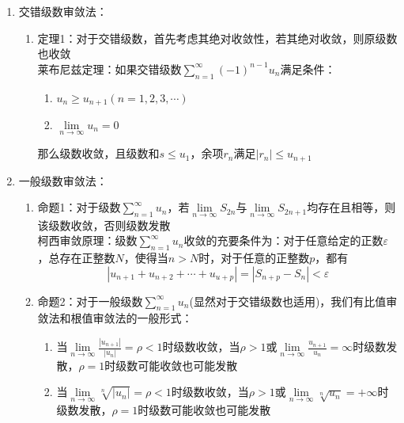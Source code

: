 \documentclass[12pt,a4paper,UTF8]{book}
\begin{document}
\begin{enumerate}
\begin{enumerate}
\end{enumerate}
\item 交错级数审敛法：
\begin{enumerate}
\item 定理1：对于交错级数，首先考虑其绝对收敛性，若其绝对收敛，则原级数也收敛\\
莱布尼兹定理：如果交错级数$\sum\limits_{n=1}^{\infty}\left(-1\right)^{n-1}u_n$满足条件：
\begin{enumerate}
\item $u_n\ge u_{n+1}\left(n=1,2,3,\cdots\right)$
\item $\lim\limits_{n\to\infty}u_n=0$
\end{enumerate}
那么级数收敛，且级数和$s\leq u_1$，余项$r_n$满足$\left|r_n\right|\leq u_{n+1}$
\end{enumerate}
\item 一般级数审敛法：
\begin{enumerate}
\item 命题1：对于级数$\sum\limits_{n=1}^{\infty}u_n$，若$\lim\limits_{n\to\infty}S_{2n}$与$\lim\limits_{n\to\infty}S_{2n+1}$均存在且相等，则该级数收敛，否则级数发散\\
柯西审敛原理：级数$\sum\limits_{n=1}^{\infty}u_n$收敛的充要条件为：对于任意给定的正数$\varepsilon$，总存在正整数$N$，使得当$n>N$时，对于任意的正整数$p$，都有
\[\left|u_{n+1}+u_{n+2}+\cdots+u_{u+p}\right|=\left|S_{n+p}-S_{n}\right|<\varepsilon\]
\item 命题2：对于一般级数$\sum\limits_{n=1}^{\infty}u_n$(显然对于交错级数也适用)，我们有比值审敛法和根值审敛法的一般形式：
\begin{enumerate}
\item 当$\lim\limits_{n\to\infty}\frac{\left|u_{n+1}\right|}{\left|u_n\right|}=\rho<1$时级数收敛，当$\rho>1$或$\lim\limits_{n\to\infty}\frac{u_{n+1}}{u_n}=\infty$时级数发散，$\rho=1$时级数可能收敛也可能发散
\item 当$\lim\limits_{n\to\infty}\sqrt[n]{\left|u_n\right|}=\rho<1$时级数收敛，当$\rho>1$或$\lim\limits_{n\to\infty}\sqrt[n]{u_n}=+\infty$时级数发散，$\rho=1$时级数可能收敛也可能发散
\end{enumerate}
\end{enumerate}
\end{enumerate}
\end{document}
